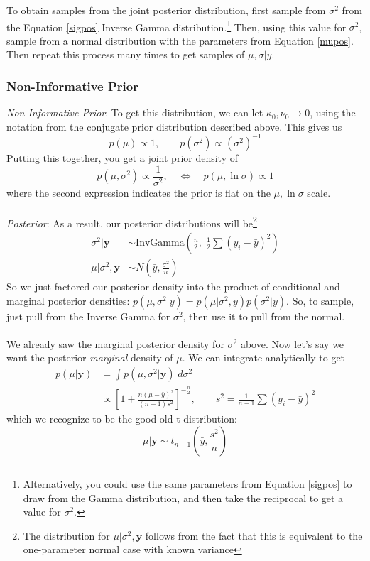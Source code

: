 \documentclass[12pt]{article}
\begin{document}
To obtain samples from the joint posterior distribution, first sample
from $\sigma^2$ from the Equation \ref{sigpos} Inverse Gamma
distribution.\footnote{Alternatively, you could use the same parameters
from Equation \ref{sigpos} to draw from the Gamma distribution, and
then take the reciprocal to get a value for $\sigma^2$.}
Then, using this value for $\sigma^2$, sample from a normal distribution
with the parameters from Equation \ref{mupos}. Then repeat this
process many times to get samples of $\mu,\sigma|y$.

\subsubsection{Non-Informative Prior}

{\sl Non-Informative Prior}: To get this distribution, we can let
$\kappa_0, \nu_0\rightarrow 0$, using the notation from the conjugate
prior distribution described above. This gives us
   \[ p(\mu) \propto 1, \qquad p(\sigma^2) \propto (\sigma^2)^{-1} \]
Putting this together, you get a joint prior density of
   \[ p(\mu, \sigma^2) \propto \frac{1}{\sigma^2}, \quad\Leftrightarrow
      \quad p(\mu, \ln \sigma) \propto 1 \]
where the second expression indicates the prior is flat on the 
$\mu, \ln \sigma$ scale. 
\\
\\
{\sl Posterior}: As a result, our posterior distributions
will be\footnote{The distribution
      for $\mu|\sigma^2,\mathbf{y}$ follows from the fact that this
      is equivalent to the one-parameter normal case with known
      variance}
\begin{align*}
   \sigma^2 | \mathbf{y} &\sim \text{InvGamma}\left(\frac{n}{2}, \;
   \frac{1}{2} \sum (y_i - \bar{y})^2 \right)\\
   \mu | \sigma^2, \mathbf{y} &\sim N\left(\bar{y}, \frac{\sigma^2}{n}
      \right) \qquad \qquad  
\end{align*}
So we just factored our posterior density into the product of conditional
and marginal posterior densities: $p(\mu, \sigma^2 |y) = 
p(\mu|\sigma^2,y) p(\sigma^2|y)$.
So, to sample, just pull from the Inverse Gamma for $\sigma^2$, 
then use it to pull from the normal.
\\
\\
We already saw the marginal posterior density for $\sigma^2$ above. 
Now let's say we want the posterior \emph{marginal} density of $\mu$. We 
can integrate analytically to get
\begin{align*}
   p(\mu|\mathbf{y}) &= \int p(\mu,\sigma^2| \mathbf{y}) \; d\sigma^2\\
   &\propto \left[ 1 + \frac{n(\mu-\bar{y})^2}{(n-1)s^2} \right]^{-
      \frac{n}{2} }, \qquad s^2 = \frac{1}{n-1} \sum (y_i - \bar{y})^2
\end{align*}
which we recognize to be the good old t-distribution:
\[ \mu|\mathbf{y} \sim t_{n-1}\left(\bar{y}, \frac{s^2}{n}\right) \]
\end{document}
